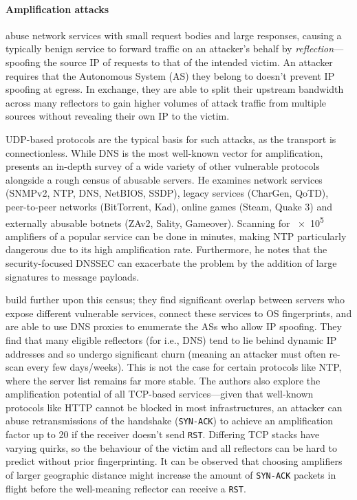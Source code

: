 \paragraph{Amplification attacks}
abuse network services with small request bodies and large responses, causing a typically benign service to forward traffic on an attacker's behalf by \emph{reflection}---spoofing the source IP of requests to that of the intended victim.
An attacker requires that the Autonomous System (AS) they belong to doesn't prevent IP spoofing at egress.
In exchange, they are able to split their upstream bandwidth across many reflectors to gain higher volumes of attack traffic from multiple sources without revealing their own IP to the victim.

UDP-based protocols are the typical basis for such attacks, as the transport is connectionless.
While DNS is the most well-known vector for amplification, \textcite{DBLP:conf/ndss/Rossow14} presents an in-depth survey of a wide variety of other vulnerable protocols alongside a rough census of abusable servers.
He examines network services (SNMPv2, NTP, DNS, NetBIOS, SSDP), legacy services (CharGen, QoTD), peer-to-peer networks (BitTorrent, Kad), online games (Steam, Quake 3) and externally abusable botnets (ZAv2, Sality, Gameover).
Scanning for \num{e5} amplifiers of a popular service can be done in minutes, making NTP particularly dangerous due to its high amplification rate.
Furthermore, he notes that the security-focused DNSSEC can exacerbate the problem by the addition of large signatures to message payloads.

\textcite{DBLP:conf/uss/KuhrerHRH14} build further upon this census; they find significant overlap between servers who expose different vulnerable services, connect these services to OS fingerprints, and are able to use DNS proxies to enumerate the ASs who allow IP spoofing.
They find that many eligible reflectors (for i.e., DNS) tend to lie behind dynamic IP addresses and so undergo significant churn (meaning an attacker must often re-scan every few days/weeks).
This is not the case for certain protocols like NTP, where the server list remains far more stable.
The authors also explore the amplification potential of all TCP-based services---given that well-known protocols like HTTP cannot be blocked in most infrastructures, an attacker can abuse retransmissions of the handshake (\texttt{SYN-ACK}) to achieve an amplification factor up to \num{20} if the receiver doesn't send \texttt{RST}.
Differing TCP stacks have varying quirks, so the behaviour of the victim and all reflectors can be hard to predict without prior fingerprinting.
It can be observed that choosing amplifiers of larger geographic distance might increase the amount of \texttt{SYN-ACK} packets in flight before the well-meaning reflector can receive a \texttt{RST}.

